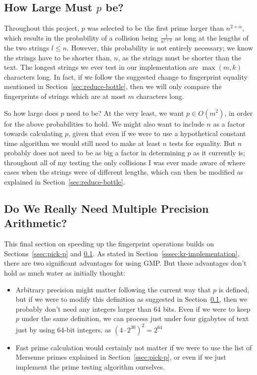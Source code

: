 \documentclass[ %
                    author={Dominic Joseph Moylett},
                    degree={MEng},
                     title={Dictionary Matching with Fingerprints},
                  subtitle={An Empirical Analysis},
                      type={research},
                      year={2015} ]{dissertation}
\begin{document}
\subsection{How Large Must $p$ be?}
\label{ssec:p-size}

Throughout this project, $p$ was selected to be the first prime larger than $n^{2 + \alpha}$, which results in the probability of a collision being $\frac{1}{n^{1 + \alpha}}$ as long at the lengths of the two strings $l \leq n$. However, this probability is not entirely necessary; we know the strings have to be shorter than, $n$, as the strings must be shorter than the text. The longest strings we ever test in our implementation are $\max(m, k)$ characters long. In fact, if we follow the suggested change to fingerprint equality mentioned in Section~\ref{sec:reduce-bottle}, then we will only compare the fingerprints of strings which are at most $m$ characters long.

So how large does $p$ need to be? At the very least, we want $p \in O(m^2)$, in order for the above probabilities to hold. We might also want to include $n$ as a factor towards calculating $p$, given that even if we were to use a hypothetical constant time algorithm we would still need to make at least $n$ tests for equality. But $n$ probably does not need to be as big a factor in determining $p$ as it currently is; throughout all of my testing the only collisions I was ever made aware of where cases when the strings were of different lengths, which can then be modified as explained in Section~\ref{sec:reduce-bottle}.

\subsection{Do We Really Need Multiple Precision Arithmetic?}
\label{ssec:do-we-need-mpa}

This final section on speeding up the fingerprint operations builds on Sections~\ref{ssec:pick-p} and \ref{ssec:p-size}. As stated in Section~\ref{sssec:kr-implementation}, there are two significant advantages for using GMP. But these advantages don't hold as much water as initially thought:

\begin{itemize}
  \item Arbitrary precision might matter following the current way that $p$ is defined, but if we were to modify this definition as suggested in Section~\ref{ssec:p-size}, then we probably don't need any integers larger than 64 bits. Even if we were to keep $p$ under the same definition, we can process just under four gigabytes of text just by using 64-bit integers, as $(4 \cdot 2^{30})^2 = 2^{64}$
  \item Fast prime calculation would certainly not matter if we were to use the list of Mersenne primes explained in Section~\ref{ssec:pick-p}, or even if we just implement the prime testing algorithm ourselves.
\end{itemize}
\end{document}
